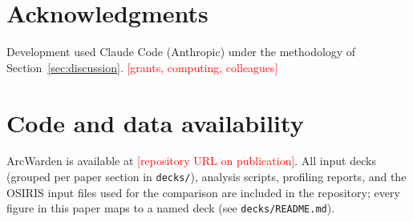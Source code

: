 \documentclass[11pt]{article}
\newcommand{\tocheck}[1]{\textcolor{red}{[#1]}}
\newcommand{\arcw}{ArcWarden}
\begin{document}
\section*{Acknowledgments}
Development used Claude Code (Anthropic) under the methodology of
Section~\ref{sec:discussion}. \tocheck{grants, computing, colleagues}

\section*{Code and data availability}
\arcw{} is available at \tocheck{repository URL on publication}. All
input decks (grouped per paper section in \texttt{decks/}), analysis
scripts, profiling reports, and the OSIRIS input files used for the
comparison are included in the repository; every figure in this paper
maps to a named deck (see \texttt{decks/README.md}).



\end{document}

